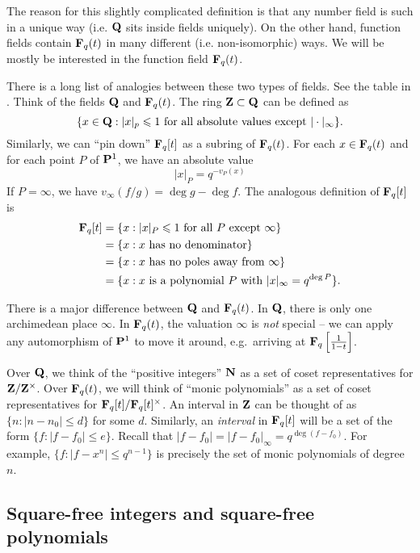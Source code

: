 The reason for this slightly complicated definition is that any number field is 
such in a unique way (i.e. $\mathbf{Q}$ sits inside fields uniquely). On the other 
hand, function fields contain $\mathbf{F}_q(t)$ in many different (i.e. non-isomorphic) 
ways. We will be mostly be interested in the function field $\mathbf{F}_q(t)$. 

There is a long list of analogies between these two types of fields. See the 
table in \cite{p13}. Think of the fields $\mathbf{Q}$ and $\mathbf{F}_q(t)$. The ring 
$\mathbf{Z}\subset \mathbf{Q}$ can be defined as 
\[
  \{x\in \mathbf{Q}:|x|_p\leqslant 1\text{ for all absolute values except }|\cdot |_\infty\} .
\]
Similarly, we can ``pin down'' $\mathbf{F}_q[t]$ as a subring of $\mathbf{F}_q(t)$. For each 
$x\in \mathbf{F}_q(t)$ and for each point $P$ of $\mathbf{P}^1$, we have an 
absolute value 
\[
  |x|_P = q^{-v_P(x)}
\]
If $P=\infty$, we have $v_\infty(f/g) = \deg g - \deg f$. The analogous 
definition of $\mathbf{F}_q[t]$ is 
\begin{align*}
  \mathbf{F}_q[t] &= \{x : |x|_P\leqslant 1\text{ for all $P$ except $\infty$} \} \\
    &= \{x:x\text{ has no denominator}\} \\
    &= \{x:x\text{ has no poles away from $\infty$}\} \\
    &= \{x:x\text{ is a polynomial $P$ with $|x|_\infty = q^{\deg P}$}\} .
\end{align*}

There is a major difference between $\mathbf{Q}$ and $\mathbf{F}_q(t)$. In $\mathbf{Q}$, there is 
only one archimedean place $\infty$. In $\mathbf{F}_q(t)$, the valuation $\infty$ is 
\emph{not} special -- we can apply any automorphism of $\mathbf{P}^1$ to move it 
around, e.g.\ arriving at $\mathbf{F}_q\left[\frac{1}{1-t}\right]$. 

Over $\mathbf{Q}$, we think of the ``positive integers'' $\mathbf{N}$ as a set of 
coset representatives for $\mathbf{Z}/\mathbf{Z}^\times$. Over $\mathbf{F}_q(t)$, we will think of 
``monic polynomials'' as a set of coset representatives for 
$\mathbf{F}_q[t]/\mathbf{F}_q[t]^\times$. An interval in $\mathbf{Z}$ can be thought of as 
$\{n:|n-n_0|\leq d\}$ for some $d$. Similarly, an \emph{interval} in $\mathbf{F}_q[t]$ 
will be a set of the form $\{f:|f-f_0|\leq e\}$. Recall that 
$|f-f_0| = |f-f_0|_\infty = q^{\deg(f-f_0)}$. For example, 
$\{f:|f-x^n|\leq q^{n-1}\}$ is precisely the set of monic polynomials of degree 
$n$. 





\subsection{Square-free integers and square-free polynomials}

